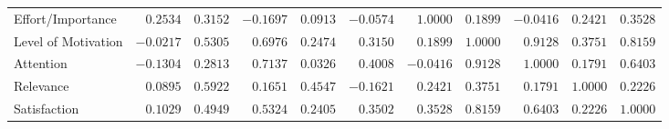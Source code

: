 \documentclass[6pt,a4paper]{article}
\begin{document}
{\begin{longtable}{lrrrrrrrrrr}
Effort/Importance&$ 0.2534$&$ 0.3152$&$-0.1697$&$ 0.0913$&$-0.0574$&$ 1.0000$&$ 0.1899$&$-0.0416$&$ 0.2421$&$0.3528$\tabularnewline
Level of Motivation&$-0.0217$&$ 0.5305$&$ 0.6976$&$ 0.2474$&$ 0.3150$&$ 0.1899$&$ 1.0000$&$ 0.9128$&$ 0.3751$&$0.8159$\tabularnewline
Attention&$-0.1304$&$ 0.2813$&$ 0.7137$&$ 0.0326$&$ 0.4008$&$-0.0416$&$ 0.9128$&$ 1.0000$&$ 0.1791$&$0.6403$\tabularnewline
Relevance&$ 0.0895$&$ 0.5922$&$ 0.1651$&$ 0.4547$&$-0.1621$&$ 0.2421$&$ 0.3751$&$ 0.1791$&$ 1.0000$&$0.2226$\tabularnewline
Satisfaction&$ 0.1029$&$ 0.4949$&$ 0.5324$&$ 0.2405$&$ 0.3502$&$ 0.3528$&$ 0.8159$&$ 0.6403$&$ 0.2226$&$1.0000$\tabularnewline
\hline
\end{longtable}}

\end{document}
